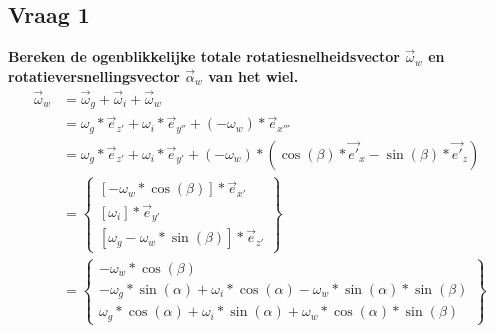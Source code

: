 \documentclass[a4paper,10pt]{article}
\begin{document}
\subsection{Vraag 1}
\textbf{Bereken de ogenblikkelijke totale rotatiesnelheidsvector $\vec{\omega}_{w}$ en rotatieversnellingsvector $\vec{\alpha}_{w}$ van het wiel.}\\


\begin{equation} 
\begin{align}
	\vec{\omega}_{w} &= \vec{\omega}_{g} + \vec{\omega}_{i} + \vec{\omega}_{w} \\
	& = {\omega}_g * \vec{e}_{z'} + {\omega}_i * \vec{e}_{y''} +(-{\omega}_w)*\vec{e}_{x'''}\\
	& =  {\omega}_g * \vec{e}_{z'} + {\omega}_i * \vec{e}_{y'} +(-{\omega}_w)*(\cos(\beta)*\vec{e'}_{x}-\sin(\beta)*\vec{e'}_{z})\\
	&=\begin{Bmatrix}
	[-\omega_w*\cos(\beta)]*\vec{e}_{x'} \\
	[\omega_i]*\vec{e}_{y'}\\
	[\omega_g-\omega_w*\sin(\beta)]*\vec{e}_{z'}
	\end{Bmatrix}\\
	& = \begin{Bmatrix}
	- {\omega}_{w} * \cos(\beta) \\
	- {\omega}_{g} * \sin(\alpha) + {\omega}_{i} * \cos(\alpha) - {\omega}_{w} * \sin(\alpha)*\sin(\beta) \\
	{\omega}_{g} * \cos(\alpha) + {\omega}_{i} * \sin(\alpha) + {\omega}_{w} * \cos(\alpha)*\sin(\beta) 
	\end{Bmatrix}
\end{align}
\end{equation}\\
\end{document}
